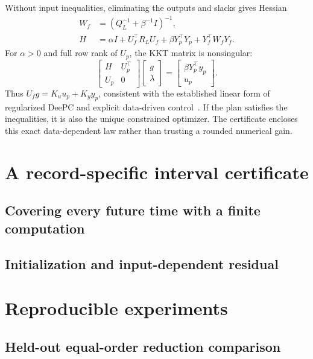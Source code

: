 \documentclass[letterpaper,10pt,conference]{ieeeconf}
\theoremstyle{remark}\newtheorem{remark}{Remark}
\begin{document}
Without input inequalities, eliminating the outputs and slacks gives Hessian
\begin{align*}
W_f&=(Q_L^{-1}+\beta^{-1}I)^{-1},\\
H&=\alpha I+U_f^\top R_LU_f+\beta Y_p^\top Y_p+Y_f^\top W_fY_f.
\end{align*}
For $\alpha>0$ and full row rank of $U_p$, the KKT matrix is nonsingular:
\begin{equation}\label{eq:kkt}
\begin{bmatrix}H&U_p^\top\\U_p&0\end{bmatrix}
\begin{bmatrix}g\\\lambda\end{bmatrix}
=\begin{bmatrix}\beta Y_p^\top y_p\\u_p\end{bmatrix}.
\end{equation}
Thus $U_fg=K_u u_p+K_y y_p$, consistent with the established linear form of regularized DeePC and explicit data-driven control~\cite{huang,breschi}. If the plan satisfies the inequalities, it is also the unique constrained optimizer. The certificate encloses this exact data-dependent law rather than trusting a rounded numerical gain.

\section{A record-specific interval certificate}
\subsection{Covering every future time with a finite computation}
\subsection{Initialization and input-dependent residual}

\section{Reproducible experiments}
\subsection{Held-out equal-order reduction comparison}
\end{document}
